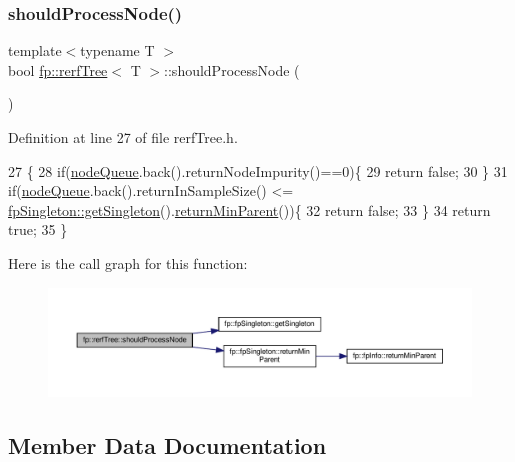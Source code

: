 \subsubsection{\texorpdfstring{should\+Process\+Node()}{shouldProcessNode()}}
{\footnotesize\ttfamily template$<$typename T $>$ \\
bool \hyperlink{classfp_1_1rerfTree}{fp\+::rerf\+Tree}$<$ T $>$\+::should\+Process\+Node (\begin{DoxyParamCaption}{ }\end{DoxyParamCaption})\hspace{0.3cm}{\ttfamily [inline]}}



Definition at line 27 of file rerf\+Tree.\+h.


\begin{DoxyCode}
27                                                \{
28                     \textcolor{keywordflow}{if}(\hyperlink{classfp_1_1rerfTree_a59b3bdcba86acbe93fd46658132218a8}{nodeQueue}.back().returnNodeImpurity()==0)\{
29                         \textcolor{keywordflow}{return} \textcolor{keyword}{false};
30                     \}
31                     \textcolor{keywordflow}{if}(\hyperlink{classfp_1_1rerfTree_a59b3bdcba86acbe93fd46658132218a8}{nodeQueue}.back().returnInSampleSize() <= 
      \hyperlink{classfp_1_1fpSingleton_a8bdae77b68521003e3fc630edec2e240}{fpSingleton::getSingleton}().\hyperlink{classfp_1_1fpSingleton_a2d06406b6462099e0adb393218090420}{returnMinParent}())\{
32                         \textcolor{keywordflow}{return} \textcolor{keyword}{false};
33                     \}
34                     \textcolor{keywordflow}{return} \textcolor{keyword}{true};
35                 \}
\end{DoxyCode}
Here is the call graph for this function\+:
\nopagebreak
\begin{figure}[H]
\begin{center}
\leavevmode
\includegraphics[width=350pt]{classfp_1_1rerfTree_ae8c63628698cd29fb24cfecf0c2e302e_cgraph}
\end{center}
\end{figure}


\subsection{Member Data Documentation}
\mbox{\label{classfp_1_1rerfTree_a07330eb1a89870eb8d3c07d0c1af0ec9}} 
